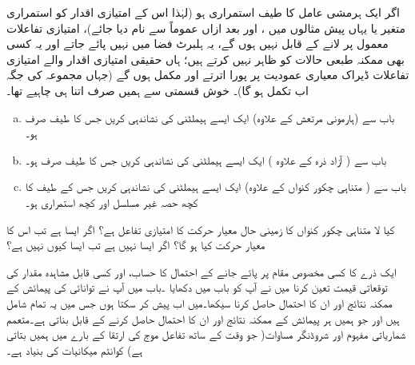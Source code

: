 اگر ایک ہرمشی عامل کا طیف استمراری ہو  (لہٰذا  اس کے امتیازی اقدار کو استمراری متغیر    یا   یہاں پیش  مثالوں   میں  ، اور  بعد ازاں  عموماً   سے نام  دیا جائے)،    امتیازی تفاعلات معمول پر لانے کے قابل نہیں ہوں گے، یہ ہلبرٹ فضا میں نہیں پائے جاتے  اور یہ  کسی بھی ممکنہ  طبعی حالات  کو ظاہر نہیں کرتے ہیں؛   ہاں حقیقی امتیازی اقدار والے  امتیازی تفاعلات   ڈیراک معیاری  عمودیت  پر پورا اترتے    اور مکمل ہوں گے (جہاں مجموعہ کی جگہ اب تکمل  ہو گا)۔  خوش قسمتی سے ہمیں صرف اتنا ہی چاہیے تھا۔
\begin{enumerate}[a.]
\item
  باب  سے   (ہارمونی مرتعش کے علاوہ)  ایک ایسے ہیملٹنی کی نشاندہی کریں  جس کا  طیف صرف   ہو۔ 
\item
باب   سے ( آزاد ذرہ کے علاوہ ) ایک  ایسے ہیملٹنی  کی نشاندہی کریں  جس کا طیف صرف  ہو۔ 
\item
 باب     سے ( متناہی چکور کنواں کے علاوہ) ایک ایسے  ہیملٹنی  کی نشاندہی کریں جس کے طیف کا کچھ حصہ غیر مسلسل اور کچھ استمراری ہو۔ 
\end{enumerate}
کیا لا متناہی چکور کنواں کا زمینی حال معیار حرکت کا  امتیازی تفاعل ہے؟ اگر ایسا ہے تب  اس کا معیار حرکت کیا ہو گا؟   اگر ایسا نہیں ہے تب  ایسا  کیوں نہیں ہے؟

ایک ذرے کا  کسی  مخصوص مقام پر پائے جانے کے احتمال کا حساب،  اور کسی  قابل مشاہدہ مقدار کی توقعاتی قیمت تعین کرنا میں نے آپ کو باب  میں دکھایا ۔باب  میں آپ نے توانائی کی پیمائش کے ممکنہ نتائج اور ان کا احتمال حاصل کرنا سیکھا۔میں اب  پیش کر سکتا ہوں  جس میں یہ تمام شامل ہیں  اور جو ہمیں  ہر پیمائش کے  ممکنہ نتائج اور ان کا احتمال حاصل کرنے کے قابل بناتی ہے۔متعمم  شماریاتی مفہوم اور  شروڈنگر مساوات( جو وقت کے ساتھ تفاعل موج کی ارتقا  کے بارے میں ہمیں بتاتی ہے) کوانٹم میکانیات کی بنیاد ہے۔

